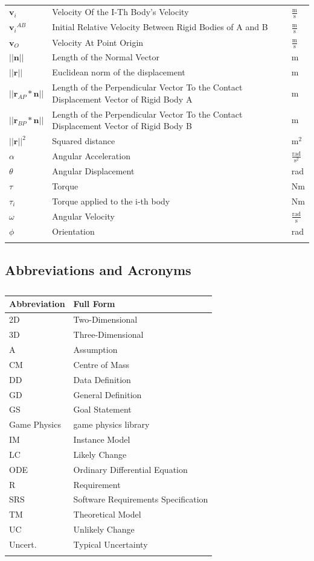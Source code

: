 \documentclass[12pt]{article}
\begin{document}
\begin{longtabu}{l X[l] l}
\\
${\mathbf{v}_{i}}$ & Velocity Of the I-Th Body's Velocity & $\frac{\text{m}}{\text{s}}$
\\
${{\mathbf{v}_{i}}^{AB}}$ & Initial Relative Velocity Between Rigid Bodies of A and B & $\frac{\text{m}}{\text{s}}$
\\
${\mathbf{v}_{O}}$ & Velocity At Point Origin & $\frac{\text{m}}{\text{s}}$
\\
$||\mathbf{n}||$ & Length of the Normal Vector & m
\\
$||\mathbf{r}||$ & Euclidean norm of the displacement & m
\\
$||{\mathbf{r}_{AP}}*\mathbf{n}||$ & Length of the Perpendicular Vector To the Contact Displacement Vector of Rigid Body A & m
\\
$||{\mathbf{r}_{BP}}*\mathbf{n}||$ & Length of the Perpendicular Vector To the Contact Displacement Vector of Rigid Body B & m
\\
${||\mathbf{r}||^{2}}$ & Squared distance & $\text{m}^{2}$
\\
$α$ & Angular Acceleration & $\frac{\text{rad}}{\text{s}^{2}}$
\\
$θ$ & Angular Displacement & rad
\\
$τ$ & Torque & Nm
\\
${τ_{i}}$ & Torque applied to the i-th body & Nm
\\
$ω$ & Angular Velocity & $\frac{\text{rad}}{\text{s}}$
\\
$ϕ$ & Orientation & rad
\\
\bottomrule
\caption{}
\label{Table:ToS}
\end{longtabu}
\subsection{Abbreviations and Acronyms}
\label{Sec:TAbbAcc}
\begin{longtable}{l l}
\toprule
\textbf{Abbreviation} & \textbf{Full Form}
\\
\midrule
\endhead
2D & Two-Dimensional
\\
3D & Three-Dimensional
\\
A & Assumption
\\
CM & Centre of Mass
\\
DD & Data Definition
\\
GD & General Definition
\\
GS & Goal Statement
\\
Game Physics & game physics library
\\
IM & Instance Model
\\
LC & Likely Change
\\
ODE & Ordinary Differential Equation
\\
R & Requirement
\\
SRS & Software Requirements Specification
\\
TM & Theoretical Model
\\
UC & Unlikely Change
\\
Uncert. & Typical Uncertainty
\\
\bottomrule
\caption{}
\label{Table:TAbbAcc}
\end{longtable}
\end{document}
